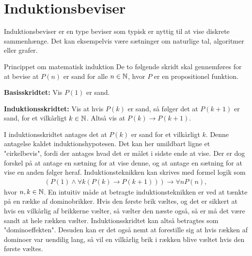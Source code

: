 \chapter{Induktionsbeviser}

Induktionsbeviser er en type beviser som typisk er nyttig til at vise diskrete sammenhænge.
Det kan eksempelvis være sætninger om naturlige tal, algoritmer eller grafer.

\begin{theorembox}{Princippet om matematisk induktion}
	De to følgende skridt skal gennemføres for at bevise at $P(n)$ er sand for alle $n \in \mathbb{N}$, hvor $P$ er en propositionel funktion.

	\textbf{Basisskridtet:} \quad 
	Vis $P(1)$ er sand.
	
	\textbf{Induktionsskridtet:} \quad 
	Vis at hvis $P(k)$ er sand, så følger det at $P(k + 1)$ er sand, for et vilkårligt $k \in \mathbb{N}$.
	Altså vis at $P \left( k \right) \to P \left( k + 1 \right)$.
\end{theorembox}

I induktionsskridtet antages det at $P(k)$ er sand for et vilkårligt $k$.
Denne antagelse kaldet induktionshypotesen.
Det kan her umildbart ligne et "cirkelbevis", fordi der antages hvad det er målet i sidste ende at vise.
Der er dog forskel på at antage en sætning for at vise denne, og at antage en sætning for at vise en anden følger heraf.
Induktionsteknikken kan skrives med formel logik som
\begin{align*}
	(P(1) \land \forall k ( P(k) \to P(k + 1))) \to \forall n P(n),
\end{align*}
hvor $n, k \in \mathbb{N}$. En intuitiv måde at betragte induktionsteknikken er ved at tænkte på en række af dominobrikker.
Hvis den første brik væltes, og det er sikkert at hvis en vilkårlig af brikkerne vælter, så vælter den næste også, så er må det være sandt at hele rækken vælter.
Induktionsskridtet kan altså betragtes som "dominoeffekten".
Desuden kan er det også nemt at forestille sig at hvis rækken af dominoer var uendilig lang, så vil en vilkårlig brik i rækken blive væltet hvis den første væltes. 

